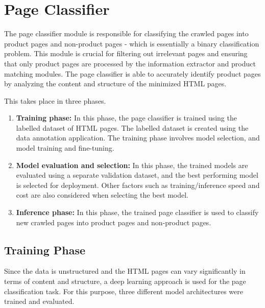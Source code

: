 \section{Page Classifier}\label{sec:page_classifier}

The page classifier module is responsible for classifying the crawled pages into product pages and non-product pages - which is essentially a binary classification problem.
This module is crucial for filtering out irrelevant pages and ensuring that only product pages are processed by the information extractor and product matching modules.
The page classifier is able to accurately identify product pages by analyzing the content and structure of the minimized HTML pages.

This takes place in three phases.
\begin{enumerate}
    \item \textbf{Training phase:} In this phase, the page classifier is trained using the labelled dataset of HTML pages.
    The labelled dataset is created using the data annotation application.
    The training phase involves model selection, and model training and fine-tuning.
    \item \textbf{Model evaluation and selection:} In this phase, the trained models are evaluated using a separate validation dataset, and the best performing model is selected for deployment.
    Other factors such as training/inference speed and cost are also considered when selecting the best model.
    \item \textbf{Inference phase:} In this phase, the trained page classifier is used to classify new crawled pages into product pages and non-product pages.
\end{enumerate}

\subsection{Training Phase}\label{subsec:page_classifier_training_phase}

Since the data is unstructured and the HTML pages can vary significantly in terms of content and structure, a deep learning approach is used for the page classification task.
For this purpose, three different model architectures were trained and evaluated.

